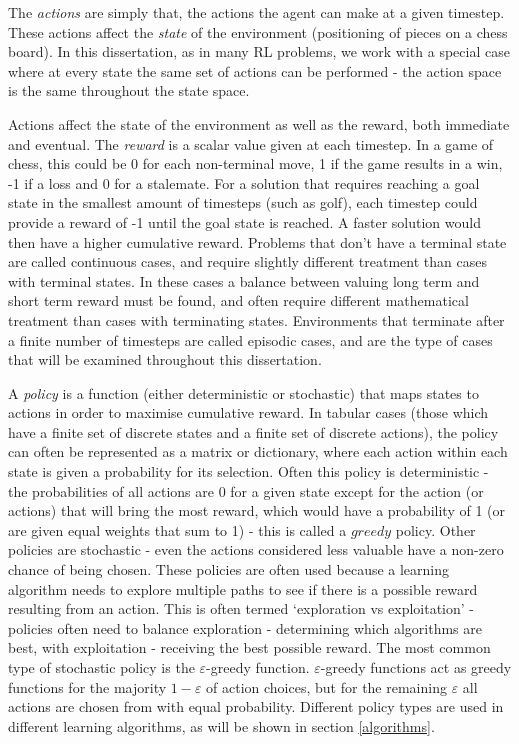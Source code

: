 The \textit{actions} are simply that, the actions the agent can make at a given timestep. These actions affect the \textit{state} of the environment (positioning of pieces on a chess board). In this dissertation, as in many RL problems, we work with a special case where at every state the same set of actions can be performed - the action space is the same throughout the state space. 

Actions affect the state of the environment as well as the reward, both immediate and eventual. The \textit{reward} is a scalar value given at each timestep. In a game of chess, this could be 0 for each non-terminal move, 1 if the game results in a win, -1 if a loss and 0 for a stalemate. For a solution that requires reaching a goal state in the smallest amount of timesteps (such as golf), each timestep could provide a reward of -1 until the goal state is reached. A faster solution would then have a higher cumulative reward. Problems that don't have a terminal state are called continuous cases, and require slightly different treatment than cases with terminal states. In these cases a balance between valuing long term and short term reward must be found, and often require different mathematical treatment than cases with terminating states. Environments that terminate after a finite number of timesteps are called episodic cases, and are the type of cases that will be examined throughout this dissertation. 

A \textit{policy} is a function (either deterministic or stochastic) that maps states to actions in order to maximise cumulative reward. In tabular cases (those which have a finite set of discrete states and a finite set of discrete actions), the policy can often be represented as a matrix or dictionary, where each action within each state is given a probability for its selection. Often this policy is deterministic - the probabilities of all actions are 0 for a given state except for the action (or actions) that will bring the most reward, which would have a probability of 1 (or are given equal weights that sum to 1) - this is called a $greedy$ policy. Other policies are stochastic - even the actions considered less valuable have a non-zero chance of being chosen. These policies are often used because a learning algorithm needs to explore multiple paths to see if there is a possible reward resulting from an action. This is often termed `exploration vs exploitation' - policies often need to balance exploration - determining which algorithms are best, with exploitation - receiving the best possible reward. The most common type of stochastic policy is the $\varepsilon$-greedy function. $\varepsilon$-greedy functions act as greedy functions for the majority $1-\varepsilon$ of action choices, but for the remaining $\varepsilon$ all actions are chosen from with equal probability. Different policy types are used in different learning algorithms, as will be shown in section \ref{algorithms}.


